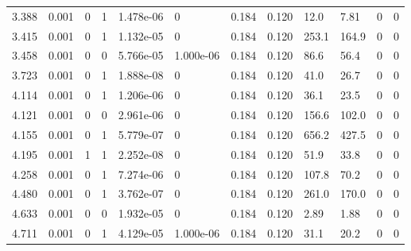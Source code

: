 \documentclass[preview]{standalone}
\begin{document}
{{\begin{tabular}{L{1.2cm}C{1.2cm} C{0.3cm}C{0.5cm} C{1.4cm}C{1.4cm} C{1.4cm}C{1.4cm} C{1.6cm}C{1.6cm} C{1.6cm}C{1.6cm}}
  3.388  &  0.001  & 0     &  1 &  1.478e-06  & 0  &  0.184&   0.120& 12.0 & 7.81   &  0 & 0  \\ 
  3.415  &  0.001  & 0     &  1 &  1.132e-05  & 0  &  0.184&   0.120& 253.1 & 164.9   &  0 & 0  \\ 
  3.458  &  0.001  & 0     &  0 &  5.766e-05  & 1.000e-06  &  0.184&   0.120& 86.6 & 56.4   &  0 & 0  \\ 
  3.723  &  0.001  & 0     &  1 &  1.888e-08  & 0  &  0.184&   0.120& 41.0 & 26.7   &  0 & 0  \\ 
  4.114  &  0.001  & 0     &  1 &  1.206e-06  & 0  &  0.184&   0.120& 36.1 & 23.5   &  0 & 0  \\ 
  4.121  &  0.001  & 0     &  0 &  2.961e-06  & 0  &  0.184&   0.120& 156.6 & 102.0   &  0 & 0  \\ 
  4.155  &  0.001  & 0     &  1 &  5.779e-07  & 0  &  0.184&   0.120& 656.2 & 427.5   &  0 & 0  \\ 
  4.195  &  0.001  & 1     &  1 &  2.252e-08  & 0  &  0.184&   0.120& 51.9 & 33.8   &  0 & 0  \\ 
  4.258  &  0.001  & 0     &  1 &  7.274e-06  & 0  &  0.184&   0.120& 107.8 & 70.2   &  0 & 0  \\ 
  4.480  &  0.001  & 0     &  1 &  3.762e-07  & 0  &  0.184&   0.120& 261.0 & 170.0   &  0 & 0  \\ 
  4.633  &  0.001  & 0     &  0 &  1.932e-05  & 0  &  0.184&   0.120& 2.89 & 1.88   &  0 & 0  \\ 
  4.711  &  0.001  & 0     &  1 &  4.129e-05  & 1.000e-06  &  0.184&   0.120& 31.1 & 20.2   &  0 & 0  \\ 
\hline 
\end{tabular} 

}}
\end{document}
